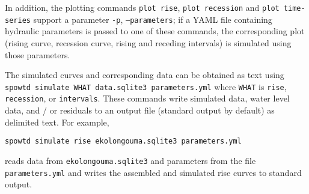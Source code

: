 \documentclass[11pt,a4paper]{article}
\begin{document}
In addition, the plotting commands \texttt{plot rise}, \texttt{plot
  recession} and \texttt{plot time-series} support a parameter
\texttt{-p}, \texttt{--parameters}; if a YAML file containing
hydraulic parameters is passed to one of these commands, the
corresponding plot (rising curve, recession curve, rising and receding
intervals) is simulated using those parameters.

The simulated curves and corresponding data can be obtained as text
using \texttt{spowtd simulate WHAT data.sqlite3 parameters.yml} where
\texttt{WHAT} is \texttt{rise}, \texttt{recession}, or
\texttt{intervals}.  These commands write simulated data, water level
data, and / or residuals to an output file (standard output by
default) as delimited text.  For example,
\begin{lstlisting}[frame=single]
spowtd simulate rise ekolongouma.sqlite3 parameters.yml
\end{lstlisting}
reads data from \texttt{ekolongouma.sqlite3} and parameters from the
file \texttt{parameters.yml} and writes the assembled and simulated
rise curves to standard output.



\end{document}
